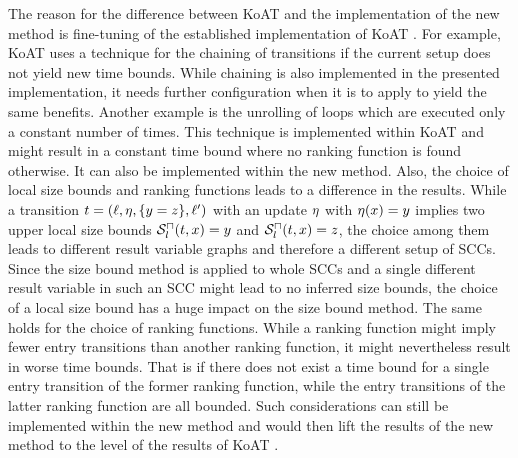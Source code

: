 The reason for the difference between KoAT \cite{koat} and the implementation of the new method is fine-tuning of the established implementation of KoAT \cite{koat}.
For example, KoAT \cite{koat} uses a technique for the chaining of transitions if the current setup does not yield new time bounds.
While chaining is also implemented in the presented implementation, it needs further configuration when it is to apply to yield the same benefits.
Another example is the unrolling of loops which are executed only a constant number of times.
This technique is implemented within KoAT \cite{koat} and might result in a constant time bound where no ranking function is found otherwise.
It can also be implemented within the new method.
Also, the choice of local size bounds and ranking functions leads to a difference in the results.
While a transition $t = (\ell, \eta, \lbrace y=z \rbrace, \ell')$ with an update $\eta$ with $\eta(x)=y$ implies two upper local size bounds ${\mathcal{S}^\sqcap_l}(t,x)=y$ and ${\mathcal{S}^\sqcap_l}(t,x)=z$, the choice among them leads to different result variable graphs and therefore a different setup of SCCs.
Since the size bound method is applied to whole SCCs and a single different result variable in such an SCC might lead to no inferred size bounds, the choice of a local size bound has a huge impact on the size bound method.
The same holds for the choice of ranking functions.
While a ranking function might imply fewer entry transitions than another ranking function, it might nevertheless result in worse time bounds.
That is if there does not exist a time bound for a single entry transition of the former ranking function, while the entry transitions of the latter ranking function are all bounded.
Such considerations can still be implemented within the new method and would then lift the results of the new method to the level of the results of KoAT \cite{koat}.
